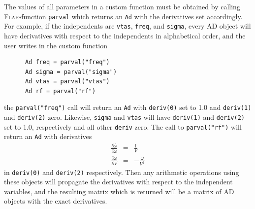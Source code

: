 \documentclass[11pt,openany,twoside]{book}
\numberwithin{equation}{section}		%
\newcommand{\Code}[1]{{\small\tt #1}}
\newcommand{\Flaps}{\textsc{Flaps\:}}
\begin{document}
The values of all parameters in a custom function must be obtained
by calling \Flaps function \Code{parval} which
returns an \Code{Ad} with the derivatives set accordingly.
For example, if the independents are \Code{vtas}, \Code{freq},
and \Code{sigma}, every AD object will have derivatives with respect to
the independents in alphabetical order, and the user writes in the custom function
\begin{lstlisting}
      Ad freq = parval("freq")
      Ad sigma = parval("sigma")
      Ad vtas = parval("vtas")
      Ad rf = parval("rf")
\end{lstlisting}
the \Code{parval("freq")} call will return an \Code{Ad} with
\Code{deriv(0)} set to 1.0 and \Code{deriv(1)} and \Code{deriv(2)} zero.
Likewise, \Code{sigma} and \Code{vtas} will have \Code{deriv(1)} and
\Code{deriv(2)} set to 1.0, respectively and all other \Code{deriv} zero.
The call to \Code{parval("rf")} will return an \Code{Ad} with derivatives
\begin{eqnarray}
\frac{\partial \bar{\omega}}{\partial \omega} &=& \frac{1}{V} \nonumber \\
\frac{\partial \bar{\omega}}{\partial V} &=& -\frac{\omega}{V^2} \nonumber
\end{eqnarray}
in \Code{deriv(0)} and \Code{deriv(2)} respectively.
Then any arithmetic operations using these objects will propagate the
derivatives with respect to the independent variables, and the resulting
matrix which is returned will be a matrix of AD objects with the
exact derivatives.
\end{document}
